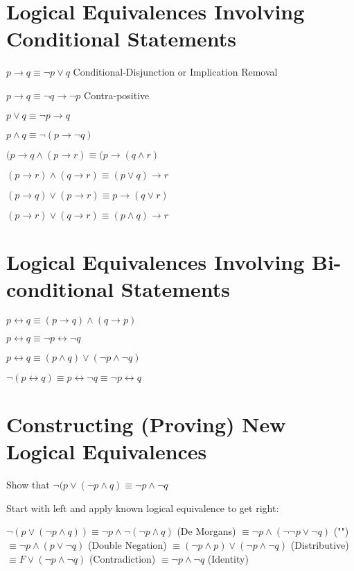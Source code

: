 \documentclass{article}
\begin{document}
\section{Logical Equivalences Involving Conditional Statements}
$p\rightarrow q\equiv \lnot p\lor q$ \hspace{2mm} Conditional-Disjunction or Implication Removal

\hfill \break
$p\rightarrow q\equiv \lnot q\rightarrow \lnot p$ \hspace{2mm} Contra-positive

\hfill \break
$p\lor q\equiv \lnot p\rightarrow q$

\hfill \break
$p\land q\equiv \lnot(p\rightarrow \lnot q)$

\hfill \break
$(p\rightarrow q\land(p\rightarrow r)\equiv(p\rightarrow(q\land r)$

\hfill \break
$(p\rightarrow r)\land(q\rightarrow r)\equiv(p\lor q)\rightarrow r$

\hfill \break
$(p\rightarrow q)\lor(p\rightarrow r)\equiv p\rightarrow(q\lor r)$

\hfill \break
$(p\rightarrow r)\lor(q\rightarrow r)\equiv(p\land q)\rightarrow r$

\section{Logical Equivalences Involving Bi-conditional Statements}
$p\leftrightarrow q\equiv(p\rightarrow q)\land(q\rightarrow p)$

\hfill \break
$p\leftrightarrow q\equiv \lnot p\leftrightarrow \lnot q$

\hfill \break
$p\leftrightarrow q\equiv(p\land q)\lor(\lnot p\land \lnot q)$

\hfill \break
$\lnot(p\leftrightarrow q)\equiv p\leftrightarrow \lnot q\equiv \lnot p\leftrightarrow q$

\section{Constructing (Proving) New Logical Equivalences}
Show that $\lnot(p\lor(\lnot p\land q)\equiv \lnot p\land \lnot q$

Start with left and apply known logical equivalence to get right:

\hfill \break
$\lnot(p\lor(\lnot p\land q))\equiv \lnot p\land \lnot(\lnot p\land q)$ \hspace{5mm} (De Morgans)
\hfill \break
$\equiv \lnot p\land(\lnot \lnot p\lor \lnot q)$ \hspace{5mm} ("\hspace{2mm}")
\hfill \break
$\equiv \lnot p\land(p\lor \lnot q)$ \hspace{5mm} (Double Negation)
\hfill \break
$\equiv(\lnot p\land p)\lor(\lnot p\land \lnot q)$ \hspace{5mm} (Distributive)
\hfill \break
$\equiv F \lor(\lnot p\land \lnot q)$ \hspace{5mm} (Contradiction)
\hfill \break
$\equiv \lnot p\land \lnot q$ \hspace{5mm} (Identity)
\end{document}
